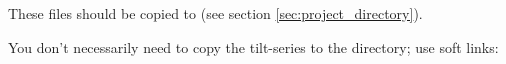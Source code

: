 These files should be copied to  (see section \ref{sec:project_directory}).

\begin{tip}You don't necessarily need to copy the tilt-series to the  directory; use soft links: \end{tip}
